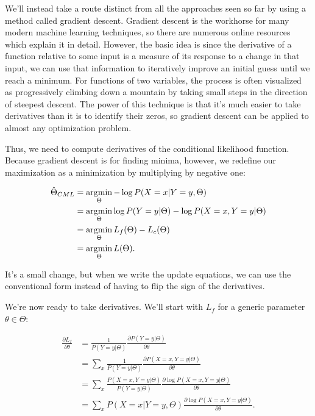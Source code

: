 We'll instead take a route distinct from all the approaches seen so far by using a method called gradient descent. Gradient descent is the workhorse for many modern machine learning techniques, so there are numerous online resources which explain it in detail. However, the basic idea is since the derivative of a function relative to some input is a measure of its response to a change in that input, we can use that information to iteratively improve an initial guess until we reach a minimum. For functions of two variables, the process is often visualized as progressively climbing down a mountain by taking small steps in the direction of steepest descent. The power of this technique is that it's much easier to take derivatives than it is to identify their zeros, so gradient descent can be applied to almost any optimization problem.

Thus, we need to compute derivatives of the conditional likelihood function. Because gradient descent is for finding minima, however, we redefine our maximization as a minimization by multiplying by negative one:

\begin{align*}
\hat{\Theta}_{CML}
&= \operatorname*{arg\!\min}_\Theta -\log P(X=x|Y=y, \Theta) \\
&= \operatorname*{arg\!\min}_\Theta \log P(Y=y|\Theta) - \log P(X=x, Y=y|\Theta) \\
&= \operatorname*{arg\!\min}_\Theta L_f(\Theta) - L_c(\Theta) \\
&= \operatorname*{arg\!\min}_\Theta L(\Theta). \\
\end{align*}

It's a small change, but when we write the update equations, we can use the conventional form instead of having to flip the sign of the derivatives.

We're now ready to take derivatives. We'll start with $L_f$ for a generic parameter $\theta \in \Theta$:

\begin{align*}
\frac{\partial L_f}{\partial \theta}
&= \frac{1}{P(Y=y|\Theta)} \frac{\partial P(Y=y|\Theta)}{\partial \theta} \\
&= \sum_x \frac{1}{P(Y=y|\Theta)} \frac{\partial P(X=x, Y=y|\Theta)}{\partial \theta} \\
&= \sum_x \frac{P(X=x, Y=y|\Theta)}{P(Y=y|\Theta)} \frac{\partial \log P(X=x, Y=y|\Theta)}{\partial \theta} \\
&= \sum_x P(X=x|Y=y, \Theta) \frac{\partial \log P(X=x, Y=y|\Theta)}{\partial \theta}. \\
\end{align*}

